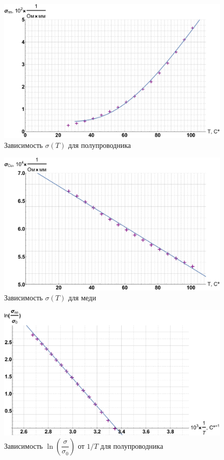 \documentclass[12pt]{kiarticle}
\begin{document}
	
		\begin{figure}[h]
		\label{graf_pp}
		\includegraphics[scale=0.47]{pp.pdf}
		\caption{Зависимость $ \sigma(T) $ для полупроводника}
	\end{figure}
	
		\begin{figure}[h]
		\includegraphics[scale=0.47]{cu.pdf}
		\caption{Зависимость $ \sigma(T) $ для меди}
				\label{graf_cu}
	\end{figure}

	\begin{figure}[h]
	\includegraphics[scale=0.47]{ln.pdf}
	\caption{Зависимость $ \ln \left( \dfrac{\sigma}{\sigma_0} \right) $ от $ 1/T $ для полупроводника}
		\label{graf_ln}
\end{figure}
\end{document}
